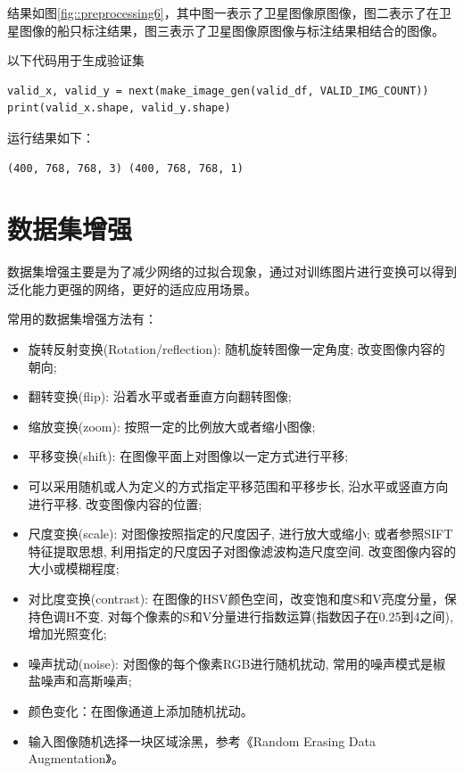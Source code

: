 结果如图\ref{fig::preprocessing6}，其中图一表示了卫星图像原图像，图二表示了在卫星图像的船只标注结果，图三表示了卫星图像原图像与标注结果相结合的图像。

以下代码用于生成验证集

\begin{lstlisting}
valid_x, valid_y = next(make_image_gen(valid_df, VALID_IMG_COUNT))
print(valid_x.shape, valid_y.shape)
\end{lstlisting}

运行结果如下：

\begin{lstlisting}
(400, 768, 768, 3) (400, 768, 768, 1)
\end{lstlisting}

\section{数据集增强}

数据集增强主要是为了减少网络的过拟合现象，通过对训练图片进行变换可以得到泛化能力更强的网络，更好的适应应用场景。

常用的数据集增强方法有：

\begin{itemize}
\tightlist
\item
  旋转\textbar{}反射变换(Rotation/reflection): 随机旋转图像一定角度;
  改变图像内容的朝向;
\item
  翻转变换(flip): 沿着水平或者垂直方向翻转图像;
\item
  缩放变换(zoom): 按照一定的比例放大或者缩小图像;
\item
  平移变换(shift): 在图像平面上对图像以一定方式进行平移;
\item
  可以采用随机或人为定义的方式指定平移范围和平移步长,
  沿水平或竖直方向进行平移. 改变图像内容的位置;
\item
  尺度变换(scale): 对图像按照指定的尺度因子, 进行放大或缩小;
  或者参照SIFT特征提取思想, 利用指定的尺度因子对图像滤波构造尺度空间.
  改变图像内容的大小或模糊程度;
\item
  对比度变换(contrast):
  在图像的HSV颜色空间，改变饱和度S和V亮度分量，保持色调H不变.
  对每个像素的S和V分量进行指数运算(指数因子在0.25到4之间), 增加光照变化;
\item
  噪声扰动(noise): 对图像的每个像素RGB进行随机扰动,
  常用的噪声模式是椒盐噪声和高斯噪声;
\item
  颜色变化：在图像通道上添加随机扰动。
\item
  输入图像随机选择一块区域涂黑，参考《Random Erasing Data
  Augmentation》。
\end{itemize}

